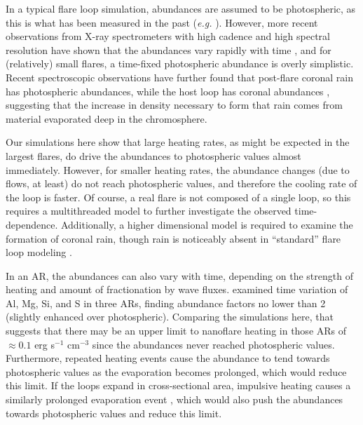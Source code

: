\documentclass[twocolumn]{aastex631}
\begin{document}
In a typical flare loop simulation, abundances are assumed to be photospheric, as this is what has been measured in the past (\textit{e.g.} \citealt{warren2014}).  However, more recent observations from X-ray spectrometers with high cadence and high spectral resolution have shown that the abundances vary rapidly with time \citep{mondal2021}, and for (relatively) small flares, a time-fixed photospheric abundance is overly simplistic.  Recent spectroscopic observations have further found that post-flare coronal rain has photospheric abundances, while the host loop has coronal abundances \citep{brooks2024}, suggesting that the increase in density necessary to form that rain comes from material evaporated deep in the chromosphere.  

Our simulations here show that large heating rates, as might be expected in the largest flares, do drive the abundances to photospheric values almost immediately.  However, for smaller heating rates, the abundance changes (due to flows, at least) do not reach photospheric values, and therefore the cooling rate of the loop is faster.  Of course, a real flare is not composed of a single loop, so this requires a multithreaded model to further investigate the observed time-dependence.  Additionally, a higher dimensional model is required to examine the formation of coronal rain, though rain is noticeably absent in ``standard'' flare loop modeling \citep{reep2020b}.  

In an AR, the abundances can also vary with time, depending on the strength of heating and amount of fractionation by wave fluxes.  \citet{mondal2023} examined time variation of Al, Mg, Si, and S in three ARs, finding abundance factors no lower than 2 (slightly enhanced over photospheric).  Comparing the simulations here, that suggests that there may be an upper limit to nanoflare heating in those ARs of $\approx 0.1$ erg s$^{-1}$ cm$^{-3}$ since the abundances never reached photospheric values.  Furthermore, repeated heating events cause the abundance to tend towards photospheric values as the evaporation becomes prolonged, which would reduce this limit.  If the loops expand in cross-sectional area, impulsive heating causes a similarly prolonged evaporation event \citep{reep2024}, which would also push the abundances towards photospheric values and reduce this limit.
\end{document}
